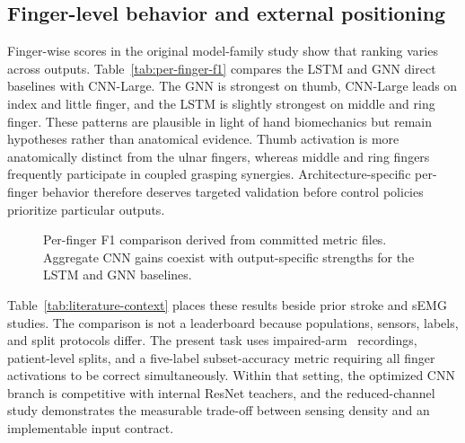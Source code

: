 \subsection{Finger-level behavior and external positioning}

Finger-wise scores in the original model-family study show that ranking varies across outputs. Table~\ref{tab:per-finger-f1} compares the LSTM and GNN direct baselines with CNN-Large. The GNN is strongest on thumb, CNN-Large leads on index and little finger, and the LSTM is slightly strongest on middle and ring finger. These patterns are plausible in light of hand biomechanics but remain hypotheses rather than anatomical evidence. Thumb activation is more anatomically distinct from the ulnar fingers, whereas middle and ring fingers frequently participate in coupled grasping synergies. Architecture-specific per-finger behavior therefore deserves targeted validation before control policies prioritize particular outputs.

\begin{table}[!htbp]
  \centering
  \small
  \caption{Per-finger F1 score in the original model-family study. Bold values mark the strongest model for each finger.}
  \label{tab:per-finger-f1}
  
\end{table}

\begin{figure}[!htbp]
  \centering
  
  \caption{Per-finger F1 comparison derived from committed metric files. Aggregate CNN gains coexist with output-specific strengths for the LSTM and GNN baselines.}
  \label{fig:per-finger-f1}
\end{figure}

Table~\ref{tab:literature-context} places these results beside prior stroke and sEMG studies. The comparison is not a leaderboard because populations, sensors, labels, and split protocols differ. The present task uses impaired-arm \physiomio\ recordings, patient-level splits, and a five-label subset-accuracy metric requiring all finger activations to be correct simultaneously. Within that setting, the optimized CNN branch is competitive with internal ResNet teachers, and the reduced-channel study demonstrates the measurable trade-off between sensing density and an implementable input contract.
